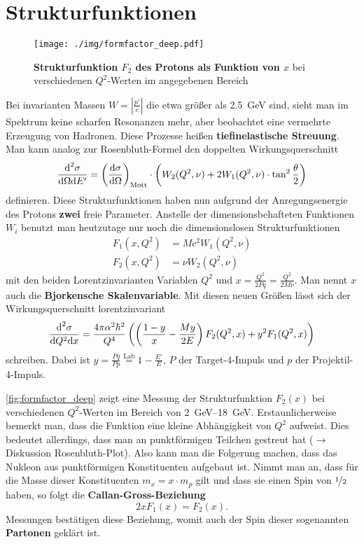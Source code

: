 \section{Strukturfunktionen}
\begin{figure}
	\centering
	\texttt{[image: ./img/formfactor\_deep.pdf]}
	\caption{\textbf{Strukturfunktion $F_2$ des Protons als Funktion von $x$} bei verschiedenen $Q^2$-Werten im angegebenen Bereich}
	\label{fig:formfactor_deep}
\end{figure}
Bei invarianten Massen $W = \left|\frac{p'}{c}\right|$ die etwa größer als \SI{2.5}{\GeV} sind, sieht man im Spektrum keine scharfen Resonanzen mehr, aber beobachtet eine vermehrte Erzeugung von Hadronen.
Diese Prozesse heißen \textbf{tiefinelastische Streuung}.
Man kann analog zur Rosenbluth-Formel den doppelten Wirkungsquerschnitt
\begin{equation*}
	\ddiff[\sigma]{\Omega}{E'} = \left(\diff[\sigma]{\Omega}\right)_\text{Mott}\cdot\left(W_2(Q^2,\nu) + 2W_1(Q^2,\nu)\cdot\tan^2\frac{\theta}{2}\right)
\end{equation*}
definieren.
Diese Strukturfunktionen haben nun aufgrund der Anregungsenergie des Protons \textbf{zwei} freie Parameter.
Anstelle der dimensionsbehafteten Funktionen $W_i$ benutzt man heutzutage nur noch die dimensionslosen Strukturfunktionen
\begin{align*}
	F_1(x,Q^2) &= Mc^2W_1(Q^2,\nu) \\
	F_2(x,Q^2) &= \nu W_2(Q^2,\nu)
\end{align*}
mit den beiden Lorentzinvarianten Variablen $Q^2$ und $x=\frac{Q^2}{2Pq}=\frac{Q^2}{2M\nu}$.
Man nennt $x$ auch die \textbf{Bjorkensche Skalenvariable}.
Mit diesen neuen Größen lässt sich der Wirkungsquerschnitt lorentzinvariant
\begin{equation*}
	\ddiff[\sigma]{Q^2}{x} = \frac{4\pi\alpha^2\hbar^2}{Q^4}\left(\left(\frac{1-y}{x}-\frac{My}{2E}\right)F_2(Q^2,x) + y^2F_1(Q^2,x)\right)
\end{equation*}
schreiben.
Dabei ist $y = \frac{Pq}{Pp}\stackrel{\text{Lab}}{=} 1-\frac{E'}{E}$, $P$ der Target-4-Impuls und $p$ der Projektil-4-Impuls.

\autoref{fig:formfactor_deep} zeigt eine Messung der Strukturfunktion $F_2(x)$ bei verschiedenen $Q^2$-Werten im Bereich von \SIrange{2}{18}{\GeV}.
Erstaunlicherweise bemerkt man, dass die Funktion eine kleine Abhängigkeit von $Q^2$ aufweist.
Dies bedeutet allerdings, dass man an punktförmigen Teilchen gestreut hat ($\rightarrow$ Diskussion Rosenbluth-Plot).
Also kann man die Folgerung machen, dass das Nukleon aus punktförmigen Konstituenten aufgebaut ist.
Nimmt man an, dass für die Masse dieser Konstituenten $m_x = x\cdot m_p$ gilt und dass sie einen Spin von $\nicefrac{1}{2}$ haben, so folgt die \textbf{Callan-Gross-Beziehung}
\begin{equation*}
	2xF_1(x) = F_2(x).
\end{equation*}
Messungen bestätigen diese Beziehung, womit auch der Spin dieser sogenannten \textbf{Partonen} geklärt ist.
